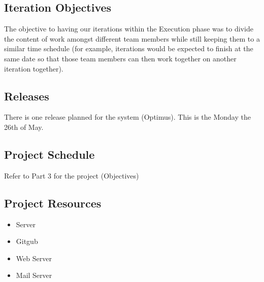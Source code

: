 
\subsection{Iteration Objectives}

The objective to having our iterations within the Execution phase was to divide the content of work amongst different team members while still keeping them to a similar time schedule (for example, iterations would be expected to finish at the same date so that those team members can then work together on another iteration together).


\subsection{Releases}

There is one release planned for the system (Optimus). This is the Monday the 26th of May.


\subsection{Project Schedule}

Refer to Part 3 for the project (Objectives)


\subsection{Project Resources}

\begin{itemize}
	\item Server
	\item Gitgub 
	\item Web Server
	\item Mail Server
\end{itemize}

